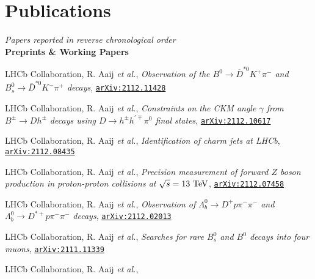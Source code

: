 \newcommand{\journal}[1]
  {\textbf{\large #1}\\\vspace{-5mm}}

\newcommand{\arxiv}[1]
  {\href{https://arxiv.org/abs/#1}{\texttt{arXiv:#1}}}


\section*{Publications}
\begin{cvcontent}
  \emph{Papers reported in reverse chronological order}\\[2.5mm]
  \journal{Preprints \& Working Papers}
  \begin{enumerate}[label={[\arabic*]}, leftmargin=1.5cm]
    \item LHCb Collaboration, R. Aaij \emph{et al.}, 
    \emph{Observation of the $B^0\rightarrow\overline{D}^{*0}K^{+}\pi^{-}$ and $B_s^0\rightarrow\overline{D}^{*0}K^{-}\pi^{+}$ decays},
    \arxiv{2112.11428}
    \item LHCb Collaboration, R. Aaij \emph{et al.}, 
    \emph{Constraints on the CKM angle $\gamma$ from $B^\pm \rightarrow Dh^\pm$ decays using $D \rightarrow h^\pm h^{\prime\mp}\pi^0$ final states},
    \arxiv{2112.10617}
    \item LHCb Collaboration, R. Aaij \emph{et al.}, 
    \emph{Identification of charm jets at LHCb},
    \arxiv{2112.08435}
    \item LHCb Collaboration, R. Aaij \emph{et al.}, 
    \emph{Precision measurement of forward $Z$ boson production in proton-proton collisions at $\sqrt{s} = 13~\rm{TeV}$},
    \arxiv{2112.07458}
    \item LHCb Collaboration, R. Aaij \emph{et al.}, 
    \emph{Observation of $\Lambda_b^0\rightarrow D^+ p \pi^-\pi^-$ and $\Lambda_b^0\rightarrow D^{*+} p \pi^-\pi^-$ decays},
    \arxiv{2112.02013}
    \item LHCb Collaboration, R. Aaij \emph{et al.}, 
    \emph{Searches for rare $B_s^0$ and $B^0$ decays into four muons},
    \arxiv{2111.11339}
    \item LHCb Collaboration, R. Aaij \emph{et al.}, 

\end{enumerate}
\end{cvcontent}
